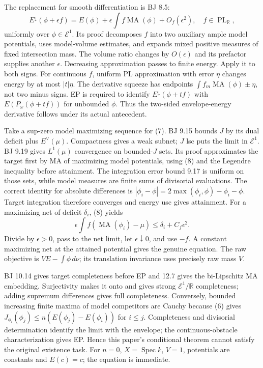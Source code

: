 \documentclass[
  11pt,
]{article}
\providecommand{\MA}{\operatorname{MA}}
\begin{document}
The replacement for smooth differentiation is BJ 8.5:
\[E^\downarrow(\phi+\epsilon f)=E(\phi)+\epsilon\int f\MA(\phi)
                           +O_f(\epsilon^2),\quad f\in\operatorname{PL}_{\mathbb R}, \tag{8}\]
uniformly over \(\phi\in\mathcal E^1\). Its proof decomposes \(f\) into
two auxiliary ample model potentials, uses model-volume estimates, and
expands mixed positive measures of fixed intersection mass. The volume
ratio changes by \(O(\epsilon)\) and its prefactor supplies another
\(\epsilon\). Decreasing approximation passes to finite energy. Apply it
to both signs. For continuous \(f\), uniform PL approximation with error
\(\eta\) changes energy by at most \(|t|\eta\). The derivative squeeze
has endpoints \(\int f_m\MA(\phi)\pm\eta\), not two minus signs. EP is
required to identify \(E^\downarrow(\phi+tf)\) with
\(E(P_\omega(\phi+tf))\) for unbounded \(\phi\). Thus the two-sided
envelope-energy derivative follows under its actual antecedent.

Take a sup-zero model maximizing sequence for (7). BJ 9.15 bounds \(J\)
by its dual deficit plus \(E^\vee(\mu)\). Compactness gives a weak
subnet; \(J\) lsc puts the limit in \(\mathcal E^1\). BJ 9.19 gives
\(L^1(\mu)\) convergence on bounded-\(J\) sets. Its proof approximates
the target first by MA of maximizing model potentials, using (8) and the
Legendre inequality before attainment. The integration error bound 9.17
is uniform on those sets, while model measures are finite sums of
divisorial evaluations. The correct identity for absolute differences is
\(|\phi_i-\phi|=2\max(\phi_i,\phi)-\phi_i-\phi\). Target integration
therefore converges and energy usc gives attainment. For a maximizing
net of deficit \(\delta_i\), (8) yields
\[\epsilon\int f(\MA(\phi_i)-\mu)\le\delta_i+C_f\epsilon^2.\] Divide by
\(\epsilon>0\), pass to the net limit, let \(\epsilon\downarrow0\), and
use \(-f\). A constant maximizing net at the attained potential gives
the genuine equation. The raw objective is \(VE-\int\phi\,d\nu\); its
translation invariance uses precisely raw mass \(V\).

BJ 10.14 gives target completeness before EP and 12.7 gives the
bi-Lipschitz MA embedding. Surjectivity makes it onto and gives strong
\(\mathcal E^1/\mathbb R\) completeness; adding supremum differences
gives full completeness. Conversely, bounded increasing finite maxima of
model competitors are Cauchy because (6) gives
\(J_{\phi_i}(\phi_j)\le n(E(\phi_j)-E(\phi_i))\) for \(i\le j\).
Completeness and divisorial determination identify the limit with the
envelope; the continuous-obstacle characterization gives EP. Hence this
paper's conditional theorem cannot satisfy the original existence task.
For \(n=0\), \(X=\operatorname{Spec}k\), \(V=1\), potentials are
constants and \(E(c)=c\); the equation is immediate.
\end{document}

